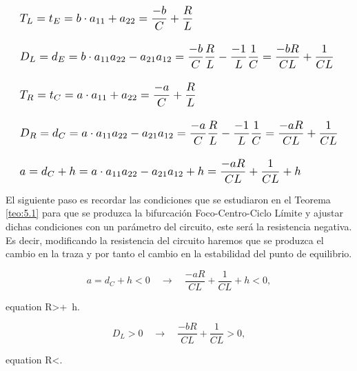 \documentclass[12pt,a4paper]{report} %
\begin{document}
	\begin{equation}
		\label{eq:misistema}
			\scalebox{1.2}{$\displaystyle
		\begin{aligned}
			&T_L=t_E = b \cdot a_{11} + a_{22} = \frac{-b}{C}+\frac{R}{L} \\[3mm]
			&D_L=d_E = b \cdot a_{11}a_{22} - a_{21}a_{12} = \frac{-b}{C}\frac{R}{L}-\frac{-1}{L}\frac{1}{C}=\frac{-bR}{CL}+\frac{1}{CL} \\[3mm]
			&T_R=t_C = a \cdot a_{11} + a_{22} = \frac{-a}{C}+\frac{R}{L} \\[3mm]
			&D_R=d_C = a \cdot a_{11}a_{22} - a_{21}a_{12} = \frac{-a}{C}\frac{R}{L}-\frac{-1}{L}\frac{1}{C}=\frac{-aR}{CL}+\frac{1}{CL}\\[3mm]
			&a=d_C+h = a \cdot a_{11}a_{22} - a_{21}a_{12}+h= \frac{-aR}{CL}+\frac{1}{CL}+h
		\end{aligned}
		$}
	\end{equation}
	
	\newpage
	
	 El siguiente paso es recordar las condiciones que se estudiaron en el Teorema \ref{teo:5.1} para que se produzca la bifurcación Foco-Centro-Ciclo Límite y ajustar dichas condiciones con un parámetro del circuito, este será la resistencia negativa. Es decir, modificando la resistencia del circuito haremos que se produzca el cambio en la traza y por tanto el cambio en la estabilidad del punto de equilibrio.
	
	\vspace{0.5cm}{\large\textbullet\quad Condición I}
	
	\begin{equation*}
		a=d_C+h<0 \quad \longrightarrow \quad \frac{-aR}{CL}+\frac{1}{CL}+h<0,
	\end{equation*}\smallskip
	\begin{empheq}[box=\fbox]{equation}
		\label{eq:cond1}
		R>+\, h.
	\end{empheq}
	
	\vspace{1cm}{\large\textbullet\quad Condición II}
	
	\begin{equation*}
		D_L>0 \quad \longrightarrow \quad \frac{-bR}{CL}+\frac{1}{CL}>0,
	\end{equation*}\smallskip
	\begin{empheq}[box=\fbox]{equation}
		\label{eq:cond2}
		R<.
	\end{empheq}
	
	\vspace{1cm}{\large\textbullet\quad Condición III}
	
\end{document}

